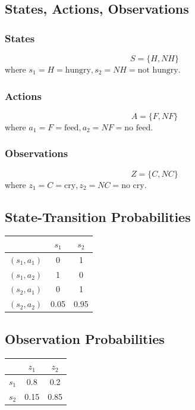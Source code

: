 \subsection{States, Actions, Observations}

\subsubsection{States}
\[S=\{H, NH\}\]
where $s_1=H=\text{hungry},s_2=NH=\text{not hungry}$.

\subsubsection{Actions}
\[A=\{F, NF\}\]
where $a_1=F=\text{feed},a_2=NF=\text{no feed}$.

\subsubsection{Observations}
\[Z=\{C, NC\}\]
where $z_1=C=\text{cry},z_2=NC=\text{no cry}$.


\subsection{State-Transition Probabilities}
\begin{center}
\begin{tabular}{c c c} 
    \hline
        & $s_1$ & $s_2$ \\ 
    \hline
    $(s_1,a_1)$ & 0 & 1 \\
    $(s_1,a_2)$ & 1 & 0 \\
    $(s_2,a_1)$ & 0 & 1 \\
    $(s_2,a_2)$ & 0.05 & 0.95 \\
    \hline
\end{tabular}
\end{center}


\subsection{Observation Probabilities}

\begin{center}
\begin{tabular}{c c c} 
    \hline
        & $z_1$ & $z_2$ \\ 
    \hline
    $s_1$ & 0.8 & 0.2 \\
    $s_2$ & 0.15 & 0.85 \\
    \hline
\end{tabular}
\end{center}



